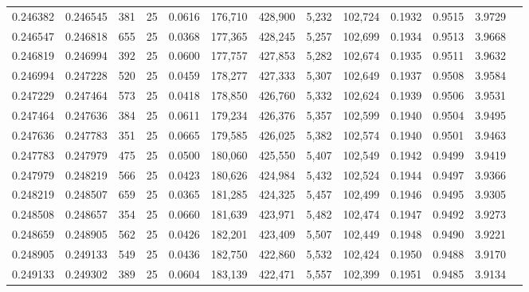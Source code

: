 \begin{tabular}{rrrrrrrrrrrrr}
0.246382 & 0.246545 &   381 &  25 &                                     0.0616 & 176,710 & 428,900 &   5,232 & 102,724 & 0.1932 & 0.9515 & 3.9729 \\
0.246547 & 0.246818 &   655 &  25 &                                     0.0368 & 177,365 & 428,245 &   5,257 & 102,699 & 0.1934 & 0.9513 & 3.9668 \\
0.246819 & 0.246994 &   392 &  25 &                                     0.0600 & 177,757 & 427,853 &   5,282 & 102,674 & 0.1935 & 0.9511 & 3.9632 \\
0.246994 & 0.247228 &   520 &  25 &                                     0.0459 & 178,277 & 427,333 &   5,307 & 102,649 & 0.1937 & 0.9508 & 3.9584 \\
0.247229 & 0.247464 &   573 &  25 &                                     0.0418 & 178,850 & 426,760 &   5,332 & 102,624 & 0.1939 & 0.9506 & 3.9531 \\
0.247464 & 0.247636 &   384 &  25 &                                     0.0611 & 179,234 & 426,376 &   5,357 & 102,599 & 0.1940 & 0.9504 & 3.9495 \\
0.247636 & 0.247783 &   351 &  25 &                                     0.0665 & 179,585 & 426,025 &   5,382 & 102,574 & 0.1940 & 0.9501 & 3.9463 \\
0.247783 & 0.247979 &   475 &  25 &                                     0.0500 & 180,060 & 425,550 &   5,407 & 102,549 & 0.1942 & 0.9499 & 3.9419 \\
0.247979 & 0.248219 &   566 &  25 &                                     0.0423 & 180,626 & 424,984 &   5,432 & 102,524 & 0.1944 & 0.9497 & 3.9366 \\
0.248219 & 0.248507 &   659 &  25 &                                     0.0365 & 181,285 & 424,325 &   5,457 & 102,499 & 0.1946 & 0.9495 & 3.9305 \\
0.248508 & 0.248657 &   354 &  25 &                                     0.0660 & 181,639 & 423,971 &   5,482 & 102,474 & 0.1947 & 0.9492 & 3.9273 \\
0.248659 & 0.248905 &   562 &  25 &                                     0.0426 & 182,201 & 423,409 &   5,507 & 102,449 & 0.1948 & 0.9490 & 3.9221 \\
0.248905 & 0.249133 &   549 &  25 &                                     0.0436 & 182,750 & 422,860 &   5,532 & 102,424 & 0.1950 & 0.9488 & 3.9170 \\
0.249133 & 0.249302 &   389 &  25 &                                     0.0604 & 183,139 & 422,471 &   5,557 & 102,399 & 0.1951 & 0.9485 & 3.9134 \\

\end{tabular}

